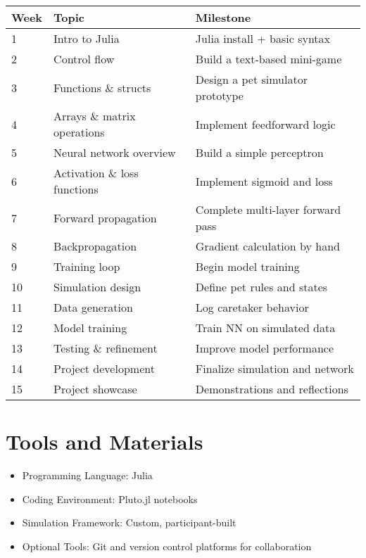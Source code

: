 \documentclass[10pt]{book}
\begin{document}
\begin{center}
\begin{tabular}{@{}llp{7cm}@{}}
\toprule
\textbf{Week} & \textbf{Topic} & \textbf{Milestone} \\
\midrule
1 & Intro to Julia & Julia install + basic syntax \\
2 & Control flow & Build a text-based mini-game \\
3 & Functions \& structs & Design a pet simulator prototype \\
4 & Arrays \& matrix operations & Implement feedforward logic \\
5 & Neural network overview & Build a simple perceptron \\
6 & Activation \& loss functions & Implement sigmoid and loss \\
7 & Forward propagation & Complete multi-layer forward pass \\
8 & Backpropagation & Gradient calculation by hand \\
9 & Training loop & Begin model training \\
10 & Simulation design & Define pet rules and states \\
11 & Data generation & Log caretaker behavior \\
12 & Model training & Train NN on simulated data \\
13 & Testing \& refinement & Improve model performance \\
14 & Project development & Finalize simulation and network \\
15 & Project showcase & Demonstrations and reflections \\
\bottomrule
\end{tabular}
\end{center}

\section{Tools and Materials}

\begin{itemize}[itemsep=1ex]
    \item Programming Language: Julia
    \item Coding Environment: Pluto.jl notebooks
    \item Simulation Framework: Custom, participant-built
    \item Optional Tools: Git and version control platforms for collaboration
\end{itemize}
\end{document}

